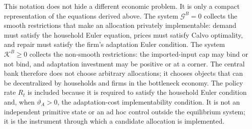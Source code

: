 ﻿\documentclass[12pt]{article}
\theoremstyle{remark}
\begin{document}
This notation does not hide a different economic problem. It is only a compact representation of
the equations derived above. The system $\mathcal G^B=0$ collects the smooth restrictions that make
an allocation privately implementable: demand must satisfy the household Euler equation, prices
must satisfy Calvo optimality, and repair must satisfy the firm's adaptation Euler condition. The
system $\mathcal K^B\ge0$ collects the non-smooth restrictions: the imported-input cap may bind or
not bind, and adaptation investment may be positive or at a corner. The central bank therefore does
not choose arbitrary allocations; it chooses objects that can be decentralized by households and
firms in the bottleneck economy. The policy rate $R_t$ is included because it is required to satisfy
the household Euler condition and, when $\vartheta_A>0$, the adaptation-cost implementability
condition. It is not an independent primitive state or an ad hoc control outside the equilibrium
system; it is the instrument through which a candidate allocation is implemented.
\end{document}
